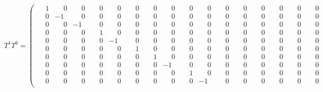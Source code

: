 \documentclass[10pt]{article}
\begin{document}
\[
T^{1}T^{6} = \left(\begin{smallmatrix}
\phantom{-}1 & \phantom{-}0 & \phantom{-}0 & \phantom{-}0 & \phantom{-}0 & \phantom{-}0 & \phantom{-}0 & \phantom{-}0 & \phantom{-}0 & \phantom{-}0 & \phantom{-}0 & \phantom{-}0 & \phantom{-}0 & \phantom{-}0 & \phantom{-}0 & \phantom{-}0 \\
\phantom{-}0 & -1 & \phantom{-}0 & \phantom{-}0 & \phantom{-}0 & \phantom{-}0 & \phantom{-}0 & \phantom{-}0 & \phantom{-}0 & \phantom{-}0 & \phantom{-}0 & \phantom{-}0 & \phantom{-}0 & \phantom{-}0 & \phantom{-}0 & \phantom{-}0 \\
\phantom{-}0 & \phantom{-}0 & -1 & \phantom{-}0 & \phantom{-}0 & \phantom{-}0 & \phantom{-}0 & \phantom{-}0 & \phantom{-}0 & \phantom{-}0 & \phantom{-}0 & \phantom{-}0 & \phantom{-}0 & \phantom{-}0 & \phantom{-}0 & \phantom{-}0 \\
\phantom{-}0 & \phantom{-}0 & \phantom{-}0 & \phantom{-}1 & \phantom{-}0 & \phantom{-}0 & \phantom{-}0 & \phantom{-}0 & \phantom{-}0 & \phantom{-}0 & \phantom{-}0 & \phantom{-}0 & \phantom{-}0 & \phantom{-}0 & \phantom{-}0 & \phantom{-}0 \\
\phantom{-}0 & \phantom{-}0 & \phantom{-}0 & \phantom{-}0 & -1 & \phantom{-}0 & \phantom{-}0 & \phantom{-}0 & \phantom{-}0 & \phantom{-}0 & \phantom{-}0 & \phantom{-}0 & \phantom{-}0 & \phantom{-}0 & \phantom{-}0 & \phantom{-}0 \\
\phantom{-}0 & \phantom{-}0 & \phantom{-}0 & \phantom{-}0 & \phantom{-}0 & \phantom{-}1 & \phantom{-}0 & \phantom{-}0 & \phantom{-}0 & \phantom{-}0 & \phantom{-}0 & \phantom{-}0 & \phantom{-}0 & \phantom{-}0 & \phantom{-}0 & \phantom{-}0 \\
\phantom{-}0 & \phantom{-}0 & \phantom{-}0 & \phantom{-}0 & \phantom{-}0 & \phantom{-}0 & \phantom{-}1 & \phantom{-}0 & \phantom{-}0 & \phantom{-}0 & \phantom{-}0 & \phantom{-}0 & \phantom{-}0 & \phantom{-}0 & \phantom{-}0 & \phantom{-}0 \\
\phantom{-}0 & \phantom{-}0 & \phantom{-}0 & \phantom{-}0 & \phantom{-}0 & \phantom{-}0 & \phantom{-}0 & -1 & \phantom{-}0 & \phantom{-}0 & \phantom{-}0 & \phantom{-}0 & \phantom{-}0 & \phantom{-}0 & \phantom{-}0 & \phantom{-}0 \\
\phantom{-}0 & \phantom{-}0 & \phantom{-}0 & \phantom{-}0 & \phantom{-}0 & \phantom{-}0 & \phantom{-}0 & \phantom{-}0 & \phantom{-}1 & \phantom{-}0 & \phantom{-}0 & \phantom{-}0 & \phantom{-}0 & \phantom{-}0 & \phantom{-}0 & \phantom{-}0 \\
\phantom{-}0 & \phantom{-}0 & \phantom{-}0 & \phantom{-}0 & \phantom{-}0 & \phantom{-}0 & \phantom{-}0 & \phantom{-}0 & \phantom{-}0 & -1 & \phantom{-}0 & \phantom{-}0 & \phantom{-}0 & \phantom{-}0 & \phantom{-}0 & \phantom{-}0 \\

\end{smallmatrix}\]
\end{document}
